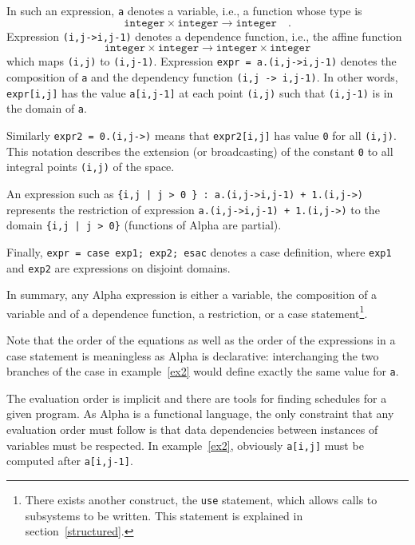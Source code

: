 \documentclass[12pt]{article}
\newcommand{\Alpha}{{\sc Alpha}}
\newcommand{\alfa}{\Alpha}
\begin{document}
\newcommand{\integer}{\texttt{integer}}
In such an expression, \texttt{a} denotes a variable, i.e., 
a function whose type is 
$$\integer{} \times \integer{} \rightarrow \integer{} \quad.$$
Expression \texttt{(i,j->i,j-1)} denotes
a dependence function, i.e., the affine function 
$$\integer{} \times \integer{} \rightarrow \integer{} \times \integer{}$$
which maps \texttt{(i,j)} to \texttt{(i,j-1)}. 
Expression \texttt{expr = a.(i,j->i,j-1)} denotes
the composition of \texttt{a} and the dependency function 
\texttt{(i,j -> i,j-1)}. 
In
other words, {\tt expr[i,j]} has the value {\tt a[i,j-1]} at each point
\texttt{(i,j)} such that \texttt{(i,j-1)} is in the domain of {\tt a}. 

Similarly {\tt expr2 = 0.(i,j->)} means that {\tt expr2[i,j]} has
value \texttt{0} for all \texttt{(i,j)}. This notation describes
the extension (or broadcasting) of the constant \texttt{0} to 
all integral points \texttt{(i,j)} of the space.

An expression such as \texttt{\{i,j | j > 0 \} : a.(i,j->i,j-1) + 1.(i,j->)}
represents the restriction of expression
\texttt{a.(i,j->i,j-1) + 1.(i,j->)} to the 
domain \texttt{\{i,j | j > 0\}} (functions of \alfa{} are
partial).

Finally, \texttt{expr = case exp1; exp2; esac} denotes 
a case definition, where \texttt{exp1} and \texttt{exp2} are
expressions on disjoint domains.

In summary, any \alfa{} expression is either a variable, 
the composition of a variable and of a dependence function, 
a restriction, or a case statement\footnote{There exists another
construct, the \texttt{use} statement, which allows calls
to subsystems to be written. This statement is explained in 
section~\ref{structured}.}.

Note that the order of the equations as well as the order of the
expressions in a case statement is meaningless
as \alfa{} is declarative:
interchanging the two branches of the case in
example~\ref{ex2} would define exactly the same value for {\tt a}.

The
evaluation order is implicit and there are tools for finding schedules
for a given program. As {\Alpha} is a functional language, the only
constraint that any evaluation order must follow is that data
dependencies between instances of 
variables must be respected. In example~\ref{ex2},
obviously {\tt a[i,j]} must be computed after {\tt a[i,j-1]}.
\end{document}
